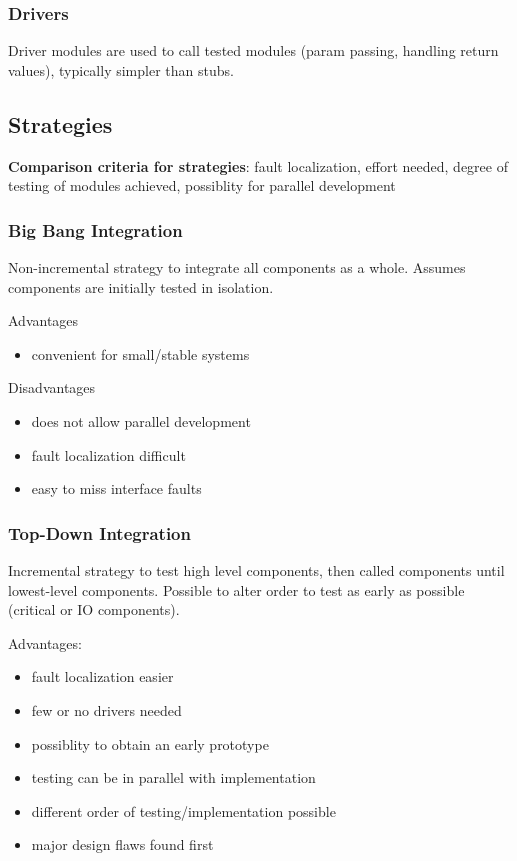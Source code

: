 \documentclass[11pt]{article}
\begin{document}
\subsubsection{Drivers}
\label{sec:org25c2f0d}
Driver modules are used to call tested modules (param passing, handling
return values), typically simpler than stubs.
\subsection{Strategies}
\label{sec:orgfbd5a7a}
\textbf{Comparison criteria for strategies}: fault localization, effort needed,
degree of testing of modules achieved, possiblity for parallel development
\subsubsection{Big Bang Integration}
\label{sec:org481983b}
Non-incremental strategy to integrate all components as a whole.
Assumes components are initially tested in isolation.

Advantages
\begin{itemize}
\item convenient for small/stable systems
\end{itemize}

Disadvantages
\begin{itemize}
\item does not allow parallel development
\item fault localization difficult
\item easy to miss interface faults
\end{itemize}
\subsubsection{Top-Down Integration}
\label{sec:org7c9a970}
Incremental strategy to test high level components, then called components
until lowest-level components.
Possible to alter order to test as early as possible (critical or IO components).

Advantages:
\begin{itemize}
\item fault localization easier
\item few or no drivers needed
\item possiblity to obtain an early prototype
\item testing can be in parallel with implementation
\item different order of testing/implementation possible
\item major design flaws found first
\end{itemize}
\end{document}
